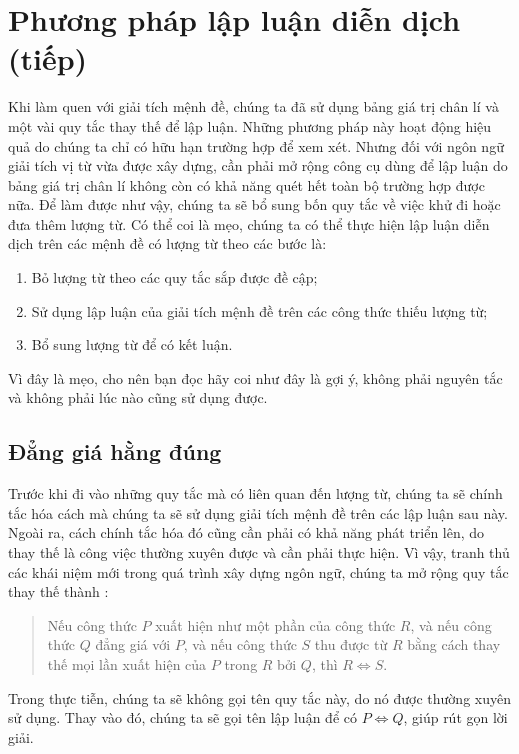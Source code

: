 \section{Phương pháp lập luận diễn dịch (tiếp)}

Khi làm quen với giải tích mệnh đề, chúng ta đã sử dụng bảng giá trị chân lí và một vài quy tắc thay thế để lập luận. Những phương pháp này hoạt động hiệu quả do chúng ta chỉ có hữu hạn trường hợp để xem xét. Nhưng đối với ngôn ngữ giải tích vị từ vừa được xây dựng, cần phải mở rộng công cụ dùng để lập luận do bảng giá trị chân lí không còn có khả năng quét hết toàn bộ trường hợp được nữa. Để làm được như vậy, chúng ta sẽ bổ sung bốn quy tắc về việc khử đi hoặc đưa thêm lượng từ. Có thể coi là mẹo, chúng ta có thể thực hiện lập luận diễn dịch trên các mệnh đề có lượng từ theo các bước là:
\begin{enumerate}
   \item Bỏ lượng từ theo các quy tắc sắp được đề cập;
   \item Sử dụng lập luận của giải tích mệnh đề trên các công thức thiếu lượng từ;
   \item Bổ sung lượng từ để có kết luận.
\end{enumerate}
Vì đây là mẹo, cho nên bạn đọc hãy coi như đây là gợi ý, không phải nguyên tắc và không phải lúc nào cũng sử dụng được.

\subsection{Đẳng giá hằng đúng}

Trước khi đi vào những quy tắc mà có liên quan đến lượng từ, chúng ta sẽ chính tắc hóa cách mà chúng ta sẽ sử dụng giải tích mệnh đề trên các lập luận sau này. Ngoài ra, cách chính tắc hóa đó cũng cần phải có khả năng phát triển lên, do thay thế là công việc thường xuyên được và cần phải thực hiện. Vì vậy, tranh thủ các khái niệm mới trong quá trình xây dựng ngôn ngữ, chúng ta mở rộng quy tắc thay thế thành :
\begin{quotation}
   Nếu công thức $P$ xuất hiện như một phần của công thức $R$, và nếu công thức $Q$ đẳng giá với $P$, và nếu công thức $S$ thu được từ $R$ bằng cách thay thế mọi lần xuất hiện của $P$ trong $R$ bởi $Q$, thì $R \iff S$.
\end{quotation}
Trong thực tiễn, chúng ta sẽ không gọi tên quy tắc này, do nó được thường xuyên sử dụng. Thay vào đó, chúng ta sẽ gọi tên lập luận để có $P \iff Q$, giúp rút gọn lời giải.

